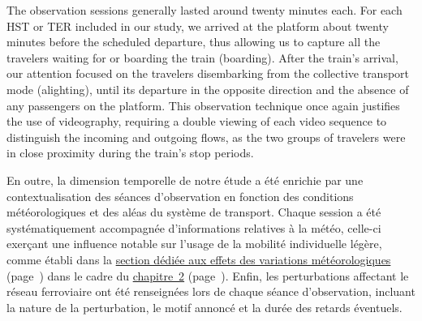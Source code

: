 \begin{refsegment}
The observation sessions generally lasted around twenty minutes each. For each \acrshort{HST} or \acrshort{TER} included in our study, we arrived at the platform about twenty minutes before the scheduled departure, thus allowing us to capture all the travelers waiting for or boarding the train (boarding). After the train's arrival, our attention focused on the travelers disembarking from the collective transport mode (alighting), until its departure in the opposite direction and the absence of any passengers on the platform. This observation technique once again justifies the use of videography, requiring a double viewing of each video sequence to distinguish the incoming and outgoing flows, as the two groups of travelers were in close proximity during the train's stop periods. %



En outre, la dimension temporelle de notre étude a été enrichie par une contextualisation des séances d'observation en fonction des conditions météorologiques et des aléas du système de transport. Chaque session a été systématiquement accompagnée d'informations relatives à la météo, celle-ci exerçant une influence notable sur l'usage de la mobilité individuelle légère, comme établi dans la \hyperref[chap2:impacts-meteo-saisons]{section dédiée aux effets des variations météorologiques} (page~\pageref{chap2:impacts-meteo-saisons}) dans le cadre du \hyperref[chap2:titre]{chapitre~2} (page~\pageref{chap2:titre}). Enfin, les perturbations affectant le réseau ferroviaire ont été renseignées lors de chaque séance d'observation, incluant la nature de la perturbation, le motif annoncé et la durée des retards éventuels.%


\end{refsegment}
